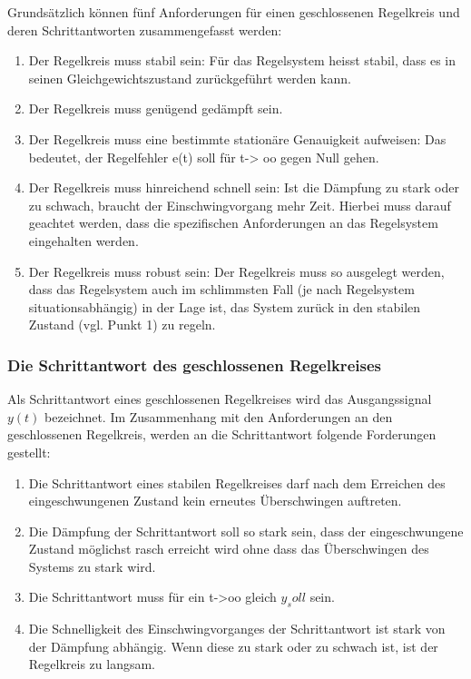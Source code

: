 Grunds\"atzlich  k\"onnen  f\"unf   Anforderungen  f\"ur  einen  geschlossenen
Regelkreis und deren Schrittantworten zusammengefasst werden:

\begin{enumerate}
    \item
        Der Regelkreis muss stabil sein:  F\"ur das Regelsystem heisst stabil,
        dass es in seinen Gleichgewichtszustand zur\"uckgef\"uhrt werden kann.
    \item
        Der Regelkreis muss gen\"ugend ged\"ampft sein.
    \item
        Der   Regelkreis   muss   eine  bestimmte   station\"are   Genauigkeit
        aufweisen: Das bedeutet, der Regelfehler e(t)  soll f\"ur t-> oo gegen
        Null gehen.
    \item
        Der  Regelkreis muss  hinreichend  schnell sein:   Ist die  D\"ampfung
        zu  stark   oder  zu  schwach,  braucht   der  Einschwingvorgang  mehr
        Zeit. Hierbei  muss  darauf  geachtet werden,  dass  die  spezifischen
        Anforderungen an das Regelsystem eingehalten werden.
    \item
        Der  Regelkreis muss  robust  sein: Der Regelkreis  muss so  ausgelegt
        werden,  dass  das  Regelsystem  auch im  schlimmsten  Fall  (je  nach
        Regelsystem situationsabh\"angig) in der Lage ist, das System zur\"uck
        in den stabilen Zustand (vgl. Punkt 1) zu regeln.
\end{enumerate}


\subsubsection*{Die Schrittantwort des geschlossenen Regelkreises}


Als Schrittantwort  eines geschlossenen  Regelkreises wird  das Ausgangssignal
$y(t)$ bezeichnet. Im Zusammenhang mit  den Anforderungen an den geschlossenen
Regelkreis, werden an die Schrittantwort folgende Forderungen gestellt:

\begin{enumerate}
    \item
        Die Schrittantwort eines stabilen Regelkreises darf nach dem Erreichen
        des eingeschwungenen Zustand kein erneutes \"Uberschwingen auftreten.
    \item
        Die  D\"ampfung  der  Schrittantwort  soll so  stark  sein,  dass  der
        eingeschwungene Zustand m\"oglichst rasch  erreicht wird ohne dass das
        \"Uberschwingen des Systems zu stark wird.
    \item
        Die Schrittantwort muss f\"ur ein t->oo gleich $y_soll$ sein.
    \item
        Die Schnelligkeit des Einschwingvorganges der Schrittantwort ist stark
        von der  D\"ampfung abh\"angig. Wenn  diese zu  stark oder  zu schwach
        ist, ist der Regelkreis zu langsam.
\end{enumerate}
